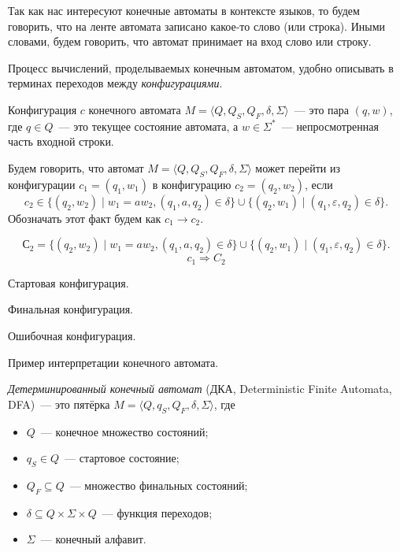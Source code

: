 Так как нас интересуют конечные автоматы в контексте языков, то будем говорить, что на ленте автомата записано какое-то слово (или строка).
Иными словами, будем говорить, что автомат принимает на вход слово или строку.

Процесс вычислений, проделываемых конечным автоматом, удобно описывать в терминах переходов между \emph{конфигурациями}.

\begin{definition}[Конфигурация]
    Конфигурация $c$ конечного автомата $M = \langle Q, Q_S, Q_F, \delta, \Sigma \rangle$~--- это пара $(q, w)$, где $q\in Q$~--- это текущее состояние автомата, а $w \in \Sigma^*$~--- непросмотренная часть входной строки.
\end{definition}

\begin{definition}
    Будем говорить, что автомат $M = \langle Q, Q_S, Q_F, \delta, \Sigma \rangle$ может перейти из конфигурации $c_1 = (q_1, w_1)$ в конфигурацию $c_2 = (q_2, w_2)$, если
    \[c_2 \in \{(q_2,w_2) \mid w_1 = aw_2, (q_1,a, q_2) \in \delta\} \cup \{(q_2,w_1) \mid (q_1, \varepsilon, q_2) \in \delta\}.\]
    Обозначать этот факт будем как $c_1 \to c_2$.
\end{definition}

$$С_2 = \{(q_2,w_2) \mid w_1 = aw_2, (q_1,a, q_2) \in \delta\} \cup \{(q_2,w_1) \mid (q_1, \varepsilon, q_2) \in \delta\}.$$
$$ c_1 \Rightarrow C_2 $$


Стартовая конфигурация.

Финальная конфигурация.

Ошибочная конфигурация.

\begin{example}
    Пример интерпретации конечного автомата.
\end{example}

\begin{definition}
    \label{def:DeterminicticFiniteAutomata}
    \emph{Детерминированный конечный автомат} (ДКА, Deterministic Finite Automata, DFA)~--- это пятёрка $M = \langle Q, q_S, Q_F, \delta, \Sigma \rangle$, где
    \begin{itemize}
        \item $Q$~--- конечное множество состояний;
        \item $q_S \in Q$~--- стартовое состояние;
        \item $Q_F \subseteq Q$~--- множество финальных состояний;
        \item $\delta \subseteq Q \times \Sigma \times Q$~--- функция переходов;
        \item $\Sigma$~--- конечный алфавит.
    \end{itemize}
\end{definition}

